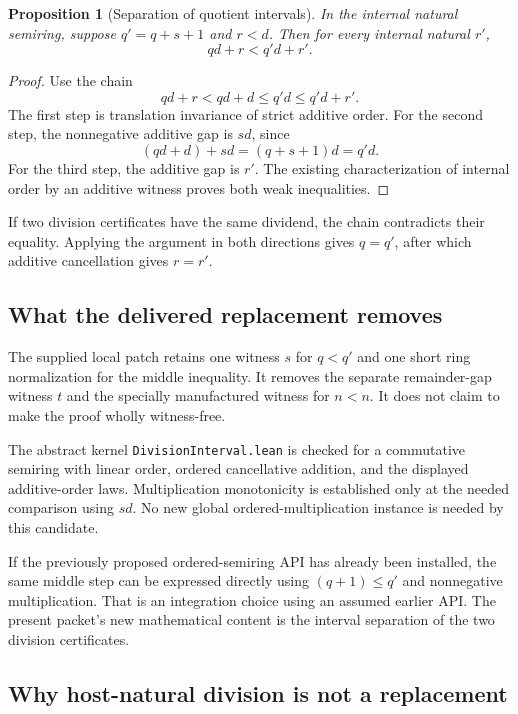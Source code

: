 \documentclass[11pt,letterpaper]{article}
\newcommand{\code}[1]{{\small\urlstyle{tt}\nolinkurl{#1}}}
\newtheorem{proposition}{Proposition}[section]
\begin{document}
\begin{proposition}[Separation of quotient intervals]
In the internal natural semiring, suppose $q'=q+s+1$ and $r<d$. Then for every internal natural $r'$,
\[
 qd+r<q'd+r'.
\]
\end{proposition}

\begin{proof}
Use the chain
\[
 qd+r < qd+d \le q'd \le q'd+r'.
\]
The first step is translation invariance of strict additive order. For the second step, the nonnegative additive gap is $sd$, since
\[
 (qd+d)+sd=(q+s+1)d=q'd.
\]
For the third step, the additive gap is $r'$. The existing characterization of internal order by an additive witness proves both weak inequalities.
\end{proof}

If two division certificates have the same dividend, the chain contradicts their equality. Applying the argument in both directions gives $q=q'$, after which additive cancellation gives $r=r'$.

\subsection{What the delivered replacement removes}

The supplied local patch retains one witness $s$ for $q<q'$ and one short ring normalization for the middle inequality. It removes the separate remainder-gap witness $t$ and the specially manufactured witness for $n<n$. It does not claim to make the proof wholly witness-free.

The abstract kernel \code{DivisionInterval.lean} is checked for a commutative semiring with linear order, ordered cancellative addition, and the displayed additive-order laws. Multiplication monotonicity is established only at the needed comparison using $sd$. No new global ordered-multiplication instance is needed by this candidate.

If the previously proposed ordered-semiring API has already been installed, the same middle step can be expressed directly using $(q+1)\le q'$ and nonnegative multiplication. That is an integration choice using an assumed earlier API. The present packet's new mathematical content is the interval separation of the two division certificates.

\subsection{Why host-natural division is not a replacement}
\end{document}
